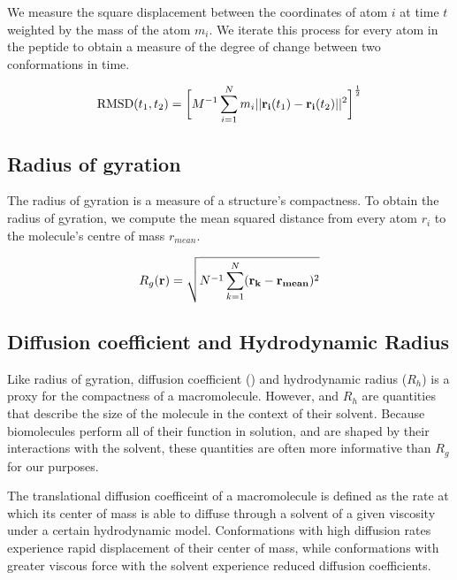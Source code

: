 We measure the square displacement between the coordinates of atom $i$ at time $t$ weighted by the mass of the atom $m_i$. We iterate this process for every atom in the peptide to obtain a measure of the degree of change between two conformations in time.

\begin{equation}
\text{RMSD}(t_1, t_2) = \bigg[ M^{-1} \sum_{i=1}^{N} m_{i} \lvert \lvert \mathbf{r_{i}}(t_{1}) - \mathbf{r_{i}}(t_{2}) \rvert \rvert^2 \bigg]^\frac{1}{2}
\end{equation}


\subsection{Radius of gyration}

The radius of gyration is a measure of a structure's compactness. To obtain the radius of gyration, we compute the mean squared distance from every atom $r_i$ to the molecule's centre of mass $r_{mean}$.

\begin{equation}
R_g(\mathbf{r}) = \sqrt{N^{-1} \sum_{k=1}^{N} (\mathbf{r_k} - \mathbf{r_{mean}})^2}
\end{equation}

\subsection{Diffusion coefficient and Hydrodynamic Radius}

Like radius of gyration, diffusion coefficient (\diffusion) and hydrodynamic radius ($R_h$) is a proxy for the compactness of a macromolecule. However, \diffusion and $R_h$ are quantities that describe the size of the molecule in the context of their solvent. Because biomolecules perform all of their function in solution, and are shaped by their interactions with the solvent, these quantities are often more informative than $R_g$ for our purposes.

The translational diffusion coefficeint of a macromolecule is defined as the rate at which its center of mass is able to diffuse through a solvent of a given viscosity under a certain hydrodynamic model. Conformations with high diffusion rates experience rapid displacement of their center of mass, while conformations with greater viscous force with the solvent experience reduced diffusion coefficients. 

